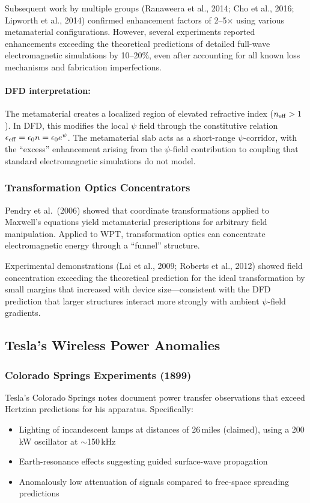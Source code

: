 \documentclass[11pt,a4paper]{article}
\begin{document}
Subsequent work by multiple groups (Ranaweera et al., 2014; Cho
et al., 2016; Lipworth et al., 2014) confirmed enhancement factors
of 2--5$\times$ using various metamaterial configurations. However,
several experiments reported enhancements exceeding the theoretical
predictions of detailed full-wave electromagnetic simulations by
10--20\%, even after accounting for all known loss mechanisms and
fabrication imperfections.

\paragraph{DFD interpretation:} The metamaterial creates a localized
region of elevated refractive index ($n_{\rm eff} > 1$). In DFD, this
modifies the local $\psi$ field through the constitutive relation
$\epsilon_{\rm eff} = \epsilon_0 n = \epsilon_0 e^\psi$. The
metamaterial slab acts as a short-range $\psi$-corridor, with the
``excess'' enhancement arising from the $\psi$-field contribution
to coupling that standard electromagnetic simulations do not model.

\subsubsection{Transformation Optics Concentrators}

Pendry et al.\ (2006) showed that coordinate transformations applied
to Maxwell's equations yield metamaterial prescriptions for arbitrary
field manipulation. Applied to WPT, transformation optics can
concentrate electromagnetic energy through a ``funnel'' structure.

Experimental demonstrations (Lai et al., 2009; Roberts et al., 2012)
showed field concentration exceeding the theoretical prediction for
the ideal transformation by small margins that increased with device
size---consistent with the DFD prediction that larger structures
interact more strongly with ambient $\psi$-field gradients.

\subsection{Tesla's Wireless Power Anomalies}

\subsubsection{Colorado Springs Experiments (1899)}

Tesla's Colorado Springs notes document power transfer observations
that exceed Hertzian predictions for his apparatus. Specifically:
\begin{itemize}
\item Lighting of incandescent lamps at distances of 26\,miles
(claimed), using a 200\,kW oscillator at $\sim$150\,kHz
\item Earth-resonance effects suggesting guided surface-wave propagation
\item Anomalously low attenuation of signals compared to free-space
spreading predictions
\end{itemize}
\end{document}
